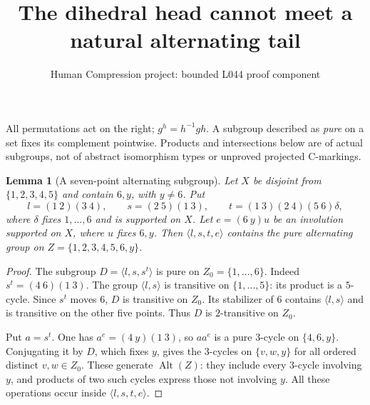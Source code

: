 \documentclass[11pt,a4paper]{article}
\title{The dihedral head cannot meet a natural alternating tail}
\author{Human Compression project: bounded L044 proof component}
\date{}
\newtheorem{lemma}{Lemma}
\newcommand{\gen}[1]{\langle#1\rangle}
\newcommand{\Alt}{\operatorname{Alt}}
\begin{document}
\maketitle
All permutations act on the right; $g^h=h^{-1}gh$.
A subgroup described as \emph{pure} on a set fixes its complement
pointwise. Products and intersections below are of actual subgroups,
not of abstract isomorphism types or unproved projected C-markings.

\begin{lemma}[A seven-point alternating subgroup]
Let $X$ be disjoint from $\{1,2,3,4,5\}$ and contain $6,y$,
with $y\ne6$. Put
\[
 l=(1\ 2)(3\ 4),\qquad s=(2\ 5)(1\ 3),\qquad
 t=(1\ 3)(2\ 4)(5\ 6)\delta,
\]
where $\delta$ fixes $1,\ldots,6$ and is supported on $X$.
Let $e=(6\ y)u$ be an involution supported on $X$, where $u$
fixes $6,y$. Then $\gen{l,s,t,e}$ contains the pure alternating
group on $Z=\{1,2,3,4,5,6,y\}$.
\end{lemma}
\begin{proof}
The subgroup $D=\gen{l,s,s^t}$ is pure on $Z_0=\{1,\ldots,6\}$.
Indeed $s^t=(4\ 6)(1\ 3)$. The group $\gen{l,s}$ is
transitive on $\{1,\ldots,5\}$: its product is a $5$-cycle.
Since $s^t$ moves $6$, $D$ is transitive on $Z_0$.
Its stabilizer of $6$ contains $\gen{l,s}$ and is transitive
on the other five points. Thus $D$ is $2$-transitive on $Z_0$.

Put $a=s^t$. One has $a^e=(4\ y)(1\ 3)$, so $aa^e$ is
a pure $3$-cycle on $\{4,6,y\}$. Conjugating it by $D$, which
fixes $y$, gives the $3$-cycles on $\{v,w,y\}$ for all
ordered distinct $v,w\in Z_0$. These generate $\Alt(Z)$:
they include every $3$-cycle involving $y$, and products of
two such cycles express those not involving $y$.
All these operations occur inside $\gen{l,s,t,e}$.
\end{proof}
\end{document}
